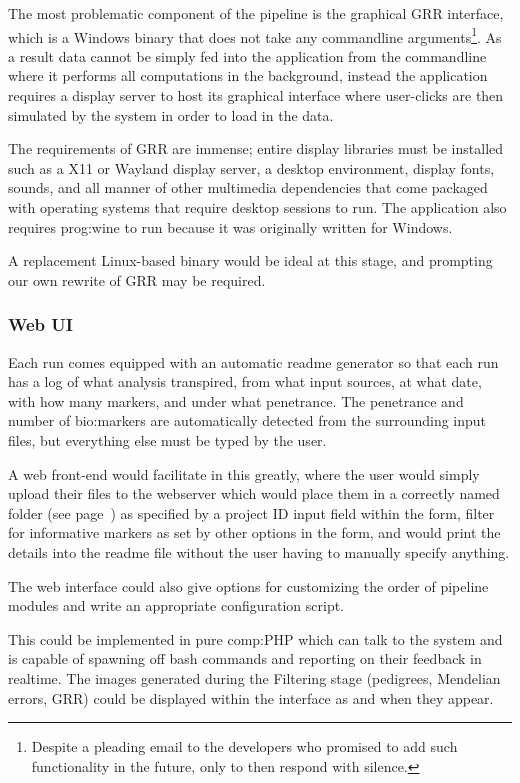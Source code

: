 The most problematic component of the pipeline is the graphical GRR interface, which is a Windows binary that does not take any commandline arguments\footnote{Despite a pleading email to the developers who promised to add such functionality in the future, only to then respond with silence.}. As a result data cannot be simply fed into the application from the commandline where it performs all computations in the background, instead the application requires a display server to host its graphical interface where user-clicks are then simulated by the system in order to load in the data.

\enlargethispage{-\baselineskip}

The requirements of GRR are immense; entire display libraries must be installed such as a X11 or Wayland display server, a desktop environment, display fonts, sounds, and all manner of other multimedia dependencies that come packaged with operating systems that require desktop sessions to run. The application also requires \gls{prog:wine} to run because it was originally written for Windows.

A replacement Linux-based binary would be ideal at this stage, and prompting our own rewrite of GRR may be required.


\subsubsection{Web UI}

Each run comes equipped with an automatic readme generator so that each run has a log of what analysis transpired, from what input sources, at what date, with how many markers, and under what penetrance. The penetrance and number of \gls{bio:markers} are automatically detected from the surrounding input files, but everything else must be typed by the user.

A web front-end would facilitate in this greatly, where the user would simply upload their files to the webserver which would place them in a correctly named folder (see page~\pageref{ref:meth:foldconv}) as specified by a project ID input field within the form, filter for informative markers as set by other options in the form, and would print the details into the readme file without the user having to manually specify anything.

The web interface could also give options for customizing the order of pipeline modules and write an appropriate configuration script.

This could be implemented in pure \gls{comp:PHP} \cite{bakken2000php} which can talk to the system and is capable of spawning off bash commands and reporting on their feedback in realtime. The images generated during the Filtering stage (pedigrees, Mendelian errors, GRR) could be displayed within the interface as and when they appear.

